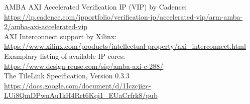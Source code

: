 \documentclass[journal,a4paper]{IEEEtran}
\begin{document}
\begin{thebibliography}{1}
		AMBA AXI Accelerated Verification IP (VIP) by Cadence:\\
		\url{https://ip.cadence.com/ipportfolio/verification-ip/accelerated-vip/arm-amba-2/amba-axi-accelerated-vip}\\
		AXI Interconnect support by Xilinx:\\
		\url{https://www.xilinx.com/products/intellectual-property/axi_interconnect.html}\\
		Examplary listing of available IP cores:\\
		\url{https://www.design-reuse.com/sip/amba-axi-c-288/}\\


		The TileLink Specification, Version 0.3.3\\
		\url{https://docs.google.com/document/d/1Iczcjigc-LUi8QmDPwnAu1kH4Rrt6Kqi1_EUaCrfrk8/pub}\\

\end{thebibliography}
\enlargethispage{-5in}
\end{document}

